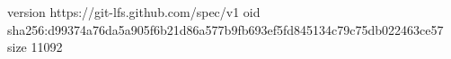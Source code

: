 version https://git-lfs.github.com/spec/v1
oid sha256:d99374a76da5a905f6b21d86a577b9fb693ef5fd845134c79c75db022463ce57
size 11092
